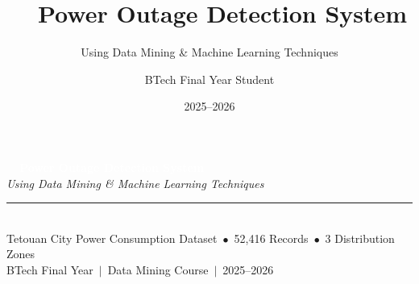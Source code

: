 \documentclass[aspectratio=169,10pt]{beamer}
\title[Power Outage Detection]{\faiBolt\ \ Power Outage Detection System}
\subtitle{Using Data Mining \& Machine Learning Techniques}
\author{BTech Final Year Student}
\institute{Data Mining Course\ $|$\ Tetouan City Dataset}
\date{2025--2026}
\begin{document}

{
\begin{frame}[plain]
\vspace{10mm}
\begin{center}
  {\fontsize{28}{32}\selectfont\bfseries\textcolor{white}{\faiBolt\ \ Power Outage Detection System}}\\[6pt]
  {\large\textcolor{AccentTeal!80!white}{\textit{Using Data Mining \& Machine Learning Techniques}}}\\[14pt]
  \textcolor{white!60}{\rule{0.55\textwidth}{0.4pt}}\\[10pt]
  {\small\textcolor{white!80}{Tetouan City Power Consumption Dataset\ $\bullet$\ 52{,}416 Records\ $\bullet$\ 3 Distribution Zones}}\\[16pt]
  {\footnotesize\textcolor{white!65}{BTech Final Year\ $|$\ Data Mining Course\ $|$\ 2025--2026}}
\end{center}
\end{frame}
}
\end{document}

